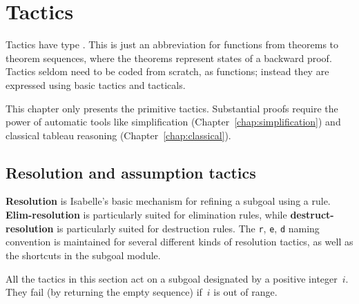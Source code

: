 \chapter{Tactics} \label{tactics}
 Tactics have type .  This is just an
abbreviation for functions from theorems to theorem sequences, where
the theorems represent states of a backward proof.  Tactics seldom
need to be coded from scratch, as functions; instead they are
expressed using basic tactics and tacticals.

This chapter only presents the primitive tactics.  Substantial proofs
require the power of automatic tools like simplification
(Chapter~\ref{chap:simplification}) and classical tableau reasoning
(Chapter~\ref{chap:classical}).

\section{Resolution and assumption tactics}
{\bf Resolution} is Isabelle's basic mechanism for refining a subgoal using
a rule.  {\bf Elim-resolution} is particularly suited for elimination
rules, while {\bf destruct-resolution} is particularly suited for
destruction rules.  The {\tt r}, {\tt e}, {\tt d} naming convention is
maintained for several different kinds of resolution tactics, as well as
the shortcuts in the subgoal module.

All the tactics in this section act on a subgoal designated by a positive
integer~$i$.  They fail (by returning the empty sequence) if~$i$ is out of
range.

